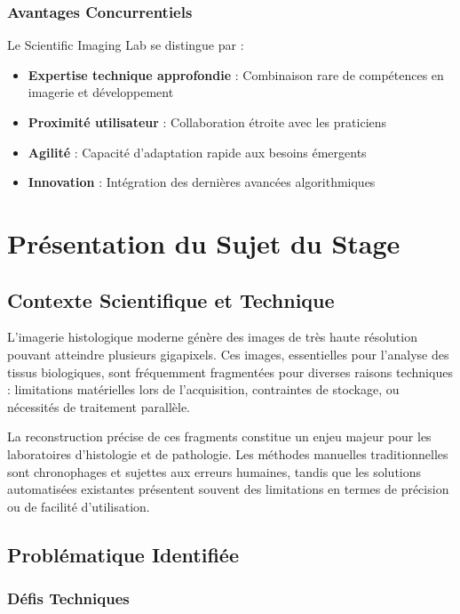 \documentclass[12pt,a4paper]{article}
\begin{document}
\subsubsection{Avantages Concurrentiels}

Le Scientific Imaging Lab se distingue par :

\begin{itemize}
\item \textbf{Expertise technique approfondie} : Combinaison rare de compétences en imagerie et développement
\item \textbf{Proximité utilisateur} : Collaboration étroite avec les praticiens
\item \textbf{Agilité} : Capacité d'adaptation rapide aux besoins émergents
\item \textbf{Innovation} : Intégration des dernières avancées algorithmiques
\end{itemize}

\newpage

\section{Présentation du Sujet du Stage}

\subsection{Contexte Scientifique et Technique}

L'imagerie histologique moderne génère des images de très haute résolution pouvant atteindre plusieurs gigapixels. Ces images, essentielles pour l'analyse des tissus biologiques, sont fréquemment fragmentées pour diverses raisons techniques : limitations matérielles lors de l'acquisition, contraintes de stockage, ou nécessités de traitement parallèle.

La reconstruction précise de ces fragments constitue un enjeu majeur pour les laboratoires d'histologie et de pathologie. Les méthodes manuelles traditionnelles sont chronophages et sujettes aux erreurs humaines, tandis que les solutions automatisées existantes présentent souvent des limitations en termes de précision ou de facilité d'utilisation.

\subsection{Problématique Identifiée}

\subsubsection{Défis Techniques}
\end{document}
